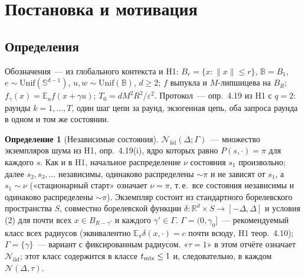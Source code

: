\documentclass[11pt,a4paper]{article}
\numberwithin{equation}{section}
\theoremstyle{definition}
\newtheorem{definition}[theorem]{Определение}
\theoremstyle{remark}
\newcommand{\E}{\mathbb E}\newcommand{\R}{\mathbb R}\newcommand{\Z}{\mathbb Z}\let\Prob\relax\newcommand{\Prob}{\mathbb P}
\newcommand{\norm}[1]{\lVert #1\rVert}\newcommand{\abs}[1]{\lvert #1\rvert}\newcommand{\ip}[2]{\langle #1,#2\rangle}
\newcommand{\cN}{\mathcal N}\newcommand{\cA}{\mathcal A}\newcommand{\cG}{\mathcal G}\newcommand{\cF}{\mathcal F}
\newcommand{\Unif}{\mathrm{Unif}}\newcommand{\TV}{\mathrm{TV}}\newcommand{\BC}{\mathrm{BC}}\newcommand{\tmix}{t_{\rm mix}}
\newcommand{\Sph}{\mathbb S^{d-1}}\newcommand{\Ball}{\mathbb B}\newcommand{\iid}{\mathrm{iid}}
\begin{document}
\section{Постановка и мотивация}\label{sec:statement}
\subsection{Определения}
Обозначения~--- из глобального контекста и H1: $B_r=\{x:\norm x\le r\}$, $\Ball=B_1$, $e\sim\Unif(\Sph)$, $u,w\sim\Unif(\Ball)$, $d\ge2$; $f$ выпукла и $M$-липшицева на $B_R$; $f_\gamma(x)=\E_uf(x+\gamma u)$; $T_0=dM^2R^2/\varepsilon^2$. Протокол~--- опр.~4.19 из H1 с $q=2$: раунды $k=1,\dots,T$, один шаг цепи за раунд, экзогенная цепь, оба запроса раунда в одном и том же состоянии.

\begin{definition}[Независимые состояния]\label{def:iid}
$\cN_\iid(\Delta;\Gamma)$~--- множество экземпляров шума из H1, опр.~4.19(i), ядро которых равно $P(s,\cdot)=\pi$ для каждого $s$. Как и в H1, начальное распределение $\nu$ состояния $s_1$ произвольно; далее $s_2,s_3,\dots$ независимы, одинаково распределены $\sim\pi$ и не зависят от $s_1$, а $s_1\sim\nu$ («стационарный старт» означает $\nu=\pi$, т.\,е.\ все состояния независимы и одинаково распределены $\sim\pi$). Экземпляр состоит из стандартного борелевского пространства $S$, совместно борелевской функции $\delta:\R^d\times S\to[-\Delta,\Delta]$ и условия (2) для почти всех $x\in B_{R-\gamma'}$ и каждого $\gamma'\in\Gamma$. $\Gamma=(0,\gamma_0]$~--- рекомендуемый класс всех радиусов (эквивалентно $\E_\pi\delta(x,\cdot)=c$ почти всюду, H1 теор.~4.10); $\Gamma=\{\gamma\}$~--- вариант с фиксированным радиусом. «$\tau=1$» в этом отчёте означает $\cN_\iid$; этот класс содержится в классе $\tmix\le1$ и, следовательно, в каждом $\cN(\Delta,\tau)$.
\end{definition}
\end{document}
